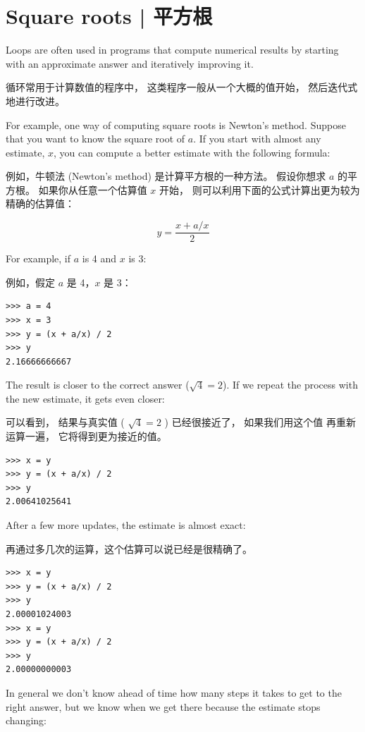 \section{Square roots  |  平方根}
\label{squareroot}

Loops are often used in programs that compute
numerical results by starting with an approximate answer and
iteratively improving it.

循环常用于计算数值的程序中， 这类程序一般从一个大概的值开始， 然后迭代式地进行改进。 

For example, one way of computing square roots is Newton's method.
Suppose that you want to know the square root of $a$.  If you start
with almost any estimate, $x$, you can compute a better
estimate with the following formula:

例如，牛顿法 (Newton's method) 是计算平方根的一种方法。 假设你想求 $a$ 的平方根。 如果你从任意一个估算值 $x$ 开始， 则可以利用下面的公式计算出更为较为精确的估算值：

\[ y = \frac{x + a/x}{2} \]

%
For example, if $a$ is 4 and $x$ is 3:

例如，假定 $a$ 是 4，$x$ 是 3：


\begin{lstlisting}
>>> a = 4
>>> x = 3
>>> y = (x + a/x) / 2
>>> y
2.16666666667
\end{lstlisting}

%
The result is closer to the correct answer ($\sqrt{4} = 2$).  If we
repeat the process with the new estimate, it gets even closer:

可以看到， 结果与真实值 ( $\sqrt{4} = 2$ ) 已经很接近了， 如果我们用这个值
再重新运算一遍， 它将得到更为接近的值。


\begin{lstlisting}
>>> x = y
>>> y = (x + a/x) / 2
>>> y
2.00641025641
\end{lstlisting}

%
After a few more updates, the estimate is almost exact:

再通过多几次的运算，这个估算可以说已经是很精确了。

\begin{lstlisting}
>>> x = y
>>> y = (x + a/x) / 2
>>> y
2.00001024003
>>> x = y
>>> y = (x + a/x) / 2
>>> y
2.00000000003
\end{lstlisting}

%
In general we don't know ahead of time how many steps it takes
to get to the right answer, but we know when we get there
because the estimate
stops changing:

